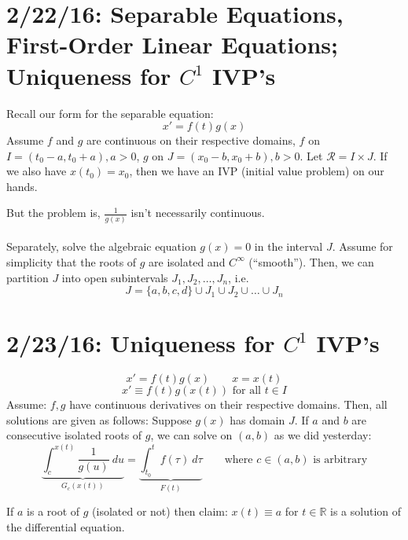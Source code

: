 \documentclass[12pt]{article}
\begin{document}
\section{2/22/16: Separable Equations, First-Order Linear Equations; Uniqueness for $C^1$ IVP's}

Recall our form for the separable equation:
\[ x' = f(t)g(x) \]
Assume $f$ and $g$ are continuous on their respective domains, $f$ on $I = (t_0 - a,t_0 + a), a>0$, $g$ on $J = (x_0 - b,x_0 + b), b>0$. Let $\mathcal{R} = I \times J$. If we also have $x(t_0) = x_0$, then we have an IVP (initial value problem) on our hands.

But the problem is, $\frac{1}{g(x)}$ isn't necessarily continuous. \\ \\

Separately, solve the algebraic equation $g(x) = 0$ in the interval $J$. Assume for simplicity that the roots of $g$ are isolated and $C^{\infty}$ (``smooth''). Then, we can partition $J$ into open subintervals $J_1,J_2,\dots,J_n$, i.e. \[J = \{a,b,c,d\}\cup J_1\cup J_2\cup \dots \cup J_n\]

\section{2/23/16: Uniqueness for $C^1$ IVP's}
\[ x' = f(t)g(x) \qquad x = x(t) \]
\[ x' \equiv f(t)g(x(t)) \text{ for all } t \in I \]
Assume: $f,g$ have continuous derivatives on their respective domains. Then, all solutions are given as follows: Suppose $g(x)$ has domain $J$. If $a$ and $b$ are consecutive isolated roots of $g$, we can solve on $(a,b)$ as we did yesterday: \[ \underbrace{\int_c^{x(t)}\frac{1}{g(u)} \ du}_{G_c(x(t))} = \underbrace{\int_{t_0}^t f(\tau) \ d\tau}_{F(t)} \qquad \text{where } c \in (a,b) \text{ is arbitrary} \]

If $a$ is a root of $g$ (isolated or not) then claim: $x(t) \equiv a$ for $t \in \mathbb{R}$ is a solution of the differential equation.
\end{document}
